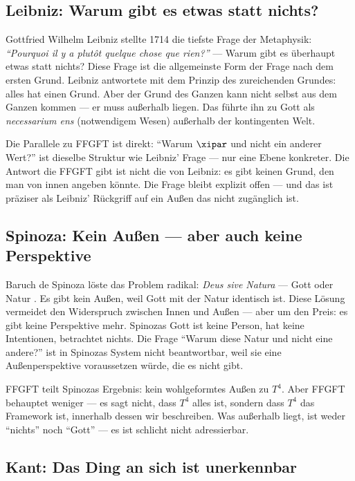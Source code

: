 \subsection{Leibniz: Warum gibt es etwas statt nichts?}

Gottfried Wilhelm Leibniz stellte 1714 die tiefste Frage der Metaphysik: \emph{``Pourquoi il y a plutôt quelque chose que rien?''} --- Warum gibt es überhaupt etwas statt nichts? \cite{Leibniz1714} Diese Frage ist die allgemeinste Form der Frage nach dem ersten Grund. Leibniz antwortete mit dem Prinzip des zureichenden Grundes: alles hat einen Grund. Aber der Grund des Ganzen kann nicht selbst aus dem Ganzen kommen --- er muss außerhalb liegen. Das führte ihn zu Gott als \emph{necessarium ens} (notwendigem Wesen) außerhalb der kontingenten Welt.

Die Parallele zu FFGFT ist direkt: ``Warum $\xipar$ und nicht ein anderer Wert?'' ist dieselbe Struktur wie Leibniz' Frage --- nur eine Ebene konkreter. Die Antwort die FFGFT gibt ist nicht die von Leibniz: es gibt keinen Grund, den man von innen angeben könnte. Die Frage bleibt explizit offen --- und das ist präziser als Leibniz' Rückgriff auf ein Außen das nicht zugänglich ist.

\subsection{Spinoza: Kein Außen --- aber auch keine Perspektive}

Baruch de Spinoza löste das Problem radikal: \emph{Deus sive Natura} --- Gott oder Natur \cite{Spinoza1677}. Es gibt kein Außen, weil Gott mit der Natur identisch ist. Diese Lösung vermeidet den Widerspruch zwischen Innen und Außen --- aber um den Preis: es gibt keine Perspektive mehr. Spinozas Gott ist keine Person, hat keine Intentionen, betrachtet nichts. Die Frage ``Warum diese Natur und nicht eine andere?'' ist in Spinozas System nicht beantwortbar, weil sie eine Außenperspektive voraussetzen würde, die es nicht gibt.

FFGFT teilt Spinozas Ergebnis: kein wohlgeformtes Außen zu $T^4$. Aber FFGFT behauptet weniger --- es sagt nicht, dass $T^4$ alles ist, sondern dass $T^4$ das Framework ist, innerhalb dessen wir beschreiben. Was außerhalb liegt, ist weder ``nichts'' noch ``Gott'' --- es ist schlicht nicht adressierbar.

\subsection{Kant: Das Ding an sich ist unerkennbar}

